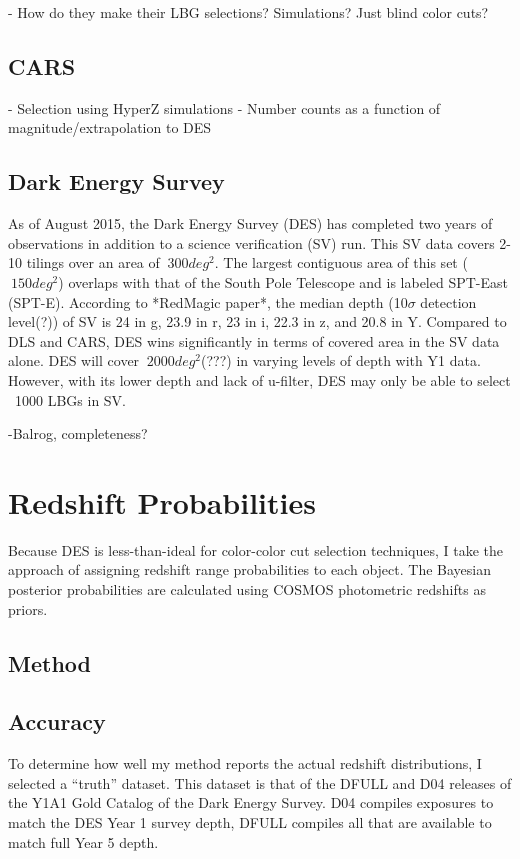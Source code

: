 \documentclass[12pt]{article}
\begin{document}
 - How do they make their LBG selections? Simulations? Just blind color cuts?

\subsection{CARS}

- Selection using HyperZ simulations
- Number counts as a function of magnitude/extrapolation to DES


\subsection{Dark Energy Survey}
As of August 2015, the Dark Energy Survey (DES) has completed two years of observations in addition to a science verification (SV) run.
This SV data covers 2-10 tilings over an area of $~300 deg^{2}$. 
The largest contiguous area of this set ($~150 deg^{2}$) overlaps with that of the South Pole Telescope and is labeled SPT-East (SPT-E).
According to *RedMagic paper*, the median depth (10$\sigma$ detection level(?)) of SV is 24 in g, 23.9 in r, 23 in i, 22.3 in z, and 20.8 in Y.
Compared to DLS and CARS, DES wins significantly in terms of covered area in the SV data alone. 
DES will cover $~2000 deg^{2}$(???) in varying levels of depth with Y1 data.
However, with its lower depth and lack of u-filter, DES may only be able to select ~1000 LBGs in SV. 

-Balrog, completeness?

\section{Redshift Probabilities}

Because DES is less-than-ideal for color-color cut selection
techniques, I take the approach of assigning redshift range probabilities to each
object. The Bayesian posterior probabilities are calculated using
COSMOS photometric redshifts as priors. 

\subsection{Method}

\subsection{Accuracy}
To determine how well my method reports the actual redshift
distributions, I selected a ``truth'' dataset. This dataset is that of
the DFULL and D04 releases of the Y1A1 Gold Catalog of the Dark Energy
Survey. D04 compiles exposures to match the DES Year 1 survey depth,
DFULL compiles all that are available to match full Year 5 depth. 
\end{document}
